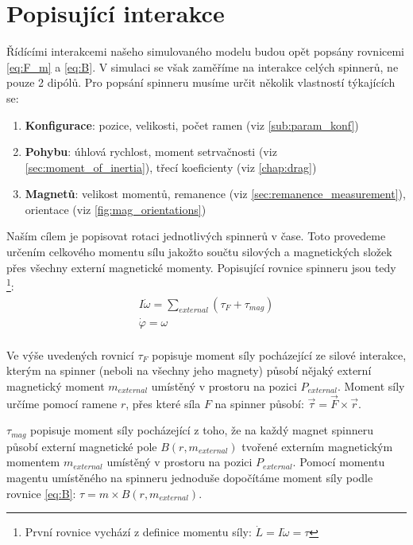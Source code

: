 \section{Popisující interakce}
Řídícími interakcemi našeho simulovaného modelu budou opět popsány rovnicemi \ref{eq:F_m} a \ref{eq:B}. V simulaci se však zaměříme na interakce celých spinnerů, ne pouze 2 dipólů. Pro popsání spinneru musíme určit několik vlastností týkajících se:
\begin{enumerate}[topsep=0pt, partopsep=0pt]
    \setlength{\itemsep}{0pt}%
    \setlength{\parskip}{0pt}%
    \item \textbf{Konfigurace}: pozice, velikosti, počet ramen (viz \autoref{sub:param_konf})
    \item \textbf{Pohybu}: úhlová rychlost, moment setrvačnosti (viz \autoref{sec:moment_of_inertia}), třecí koeficienty (viz \autoref{chap:drag})
    \item \textbf{Magnetů}: velikost momentů, remanence (viz \autoref{sec:remanence_measurement}), orientace (viz \autoref{fig:mag_orientations})
\end{enumerate}

Naším cílem je popisovat rotaci jednotlivých spinnerů v čase. Toto provedeme určením celkového momentu sílu jakožto součtu silových a magnetických složek přes všechny externí magnetické momenty. Popisující rovnice spinneru jsou tedy \footnote{První rovnice vychází z definice momentu síly: $\dot{L} = I \dot{\omega} = \tau$}:
\begin{equation}
    \label{eq:sim_equations}
    \begin{gathered}
        I\dot{\omega} = \sum_{external} (\tau_F + \tau_{mag}) \\
        \dot{\varphi} = \omega \\
    \end{gathered}
\end{equation}

Ve výše uvedených rovnicí $\tau_F$ popisuje moment síly pocházející ze silové interakce, kterým na spinner (neboli na všechny jeho magnety) působí nějaký externí magnetický moment $m_{external}$ umístěný v prostoru na pozici $P_{external}$. Moment síly určíme pomocí ramene $r$, přes které síla $F$ na spinner působí: $\vec{\tau} = \vec{F} \times \vec{r}$.

$\tau_{mag}$ popisuje moment síly pocházející z toho, že na každý magnet spinneru působí externí magnetické pole $B(r, m_{external})$ tvořené externím magnetickým momentem $m_{external}$ umístěný v prostoru na pozici $P_{external}$. Pomocí momentu magentu umístěného na spinneru jednoduše dopočítáme moment síly podle rovnice \ref{eq:B}: $\tau = m \times B(r, m_{external})$.

